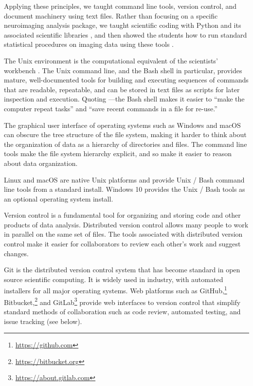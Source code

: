 Applying these principles, we taught command line tools, version control, and
document machinery using text files.  Rather than focusing on a specific
neuroimaging analysis package, we taught scientific coding with Python and its
associated scientific libraries \citep{millman2011python, perez2011python}, and
then showed the students how to run standard statistical procedures on imaging
data using these tools \citep{millman2007analysis}.

The Unix environment is the computational equivalent of the scientists'
workbench \citep{preeyanon2014reproducible}.  The Unix command line, and the
Bash shell in particular, provides mature, well-documented tools for building
and executing sequences of commands that are readable, repeatable, and can be
stored in text files as scripts for later inspection and execution.  Quoting
\cite{wilson2014best}---the Bash shell makes it easier to ``make the computer
repeat tasks'' and ``save recent commands in a file for re-use.''

The graphical user interface of operating systems such as Windows and macOS
can obscure the tree structure of the file system, making it harder to think
about the organization of data as a hierarchy of directories and files.  The
command line tools make the file system hierarchy explicit, and so make it
easier to reason about data organization.

Linux and macOS are native Unix platforms and provide Unix / Bash command line
tools from a standard install.  Windows 10 provides the Unix / Bash tools as
an optional operating system install.

Version control is a fundamental tool for organizing and storing code and
other products of data analysis.
Distributed version control allows many people to work in parallel on the
same set of files.
The tools associated with distributed version control make it easier for
collaborators to review each other's work and suggest changes.

Git is the distributed version control system that has become standard in
open source scientific computing. It is widely used in industry, with automated
installers for all major operating systems.
Web platforms such as GitHub,\footnote{\url{https://github.com}}
Bitbucket,\footnote{\url{https://bitbucket.org}} and
GitLab\footnote{\url{https://about.gitlab.com}} provide web interfaces to
version control that simplify standard methods of collaboration such as code
review, automated testing, and issue tracking (see below).

